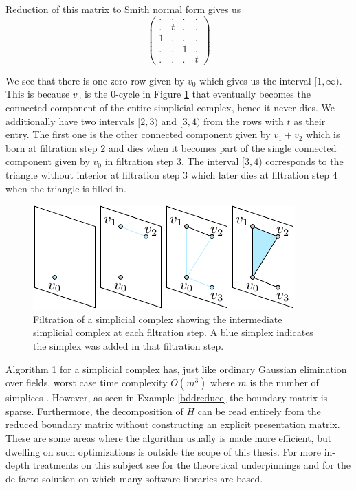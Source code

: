 \begin{example}
  Reduction of this matrix to Smith normal form gives us
  \[
    \begin{pmatrix}
      . & . & . & . \\
      . & t & . & .     \\
        1 & . & . & .     \\
        . & . & 1 & .     \\
        . & . & . & t
        \end{pmatrix}
  \]

 We see that there is one zero row given by $v_{0}$ which gives us the interval $[1,\infty)$. This is because $v_{0}$ is the $0$-cycle in Figure \ref{filtrationstack} that eventually becomes the connected component of the entire simplicial complex, hence it never dies. We additionally have two intervals $[2,3)$ and $[3,4)$ from the rows with $t$ as their entry. The first one is the other connected component given by $v_{1}+v_{2}$ which is born at filtration step $2$ and dies when it becomes part of the single connected component given by $v_{0}$ in filtration step 3. The interval $[3,4)$ corresponds to the triangle without interior at filtration step $3$ which later dies at filtration step $4$ when the triangle is filled in.


\begin{figure}[ht]
  \centering
  \includegraphics[scale=1.5]{simp_filt.pdf}
  \caption{\label{filtrationstack} Filtration of a simplicial complex showing the intermediate simplicial complex at each filtration step. A blue simplex indicates the simplex was added in that filtration step.}
\end{figure}

\end{example}

Algorithm 1 for a simplicial complex has, just like ordinary Gaussian elimination over fields, worst case time complexity $O(m^{3})$ where $m$ is the  number of simplices \cite{Zomorodian2005}. However, as seen in Example \ref{bddreduce} the boundary matrix is sparse. Furthermore, the decomposition of $H$ can be read entirely from the reduced boundary matrix without constructing an explicit presentation matrix. These are some areas where the algorithm usually is made more efficient, but dwelling on such optimizations is outside the scope of this thesis. For more in-depth treatments on this subject see  \cite{edels} for the theoretical underpinnings and \cite{ripser} for the de facto solution on which many software libraries are based.


